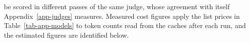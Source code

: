 be scored in different passes of the same judge, whose agreement with itself
Appendix~\ref{app-judges} measures.
Measured cost figures apply the list prices in Table~\ref{tab-app-models} to
token counts read from the caches after each run, and the estimated figures
are identified below.

